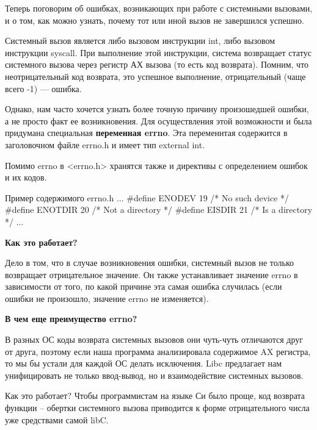 Теперь поговорим об ошибках, возникающих при работе с системными вызовами, и о том, как можно узнать, почему тот или иной вызов не завершился успешно.

Системный вызов является либо вызовом инструкции int, либо вызовом инструкции syscall. При выполнение этой инструкции, система возвращает статус системного вызова через регистр АХ вызова (то есть код возврата). Помним, что неотрицательный код возврата, это успешное выполнение, отрицательный (чаще всего -1) --- ошибка. 

Однако, нам часто хочется узнать более точную причину произошедшей ошибки, а не просто факт ее возникновения. Для осуществления этой возможности и была придумана специальная \textbf{переменная errno}. Эта переменнтая содержится в заголовочном файле errno.h и имеет тип external int.

Помимо errno в <errno.h> хранятся также и директивы с определением ошибок и их кодов.


\begin{CCode}{Пример содержимого errno.h}
	...
	#define ENODEV      19  /* No such device */
	#define ENOTDIR     20  /* Not a directory */
	#define EISDIR      21  /* Is a directory */ 
	... \end{CCode}

\textbf{Как это работает?}

Дело в том, что в случае возникновения ошибки, системный вызов не только возвращает отрицательное значение. Он также устанавливает значение errno в зависимости от того, по какой причине эта самая ошибка случилась (если ошибки не произошло, значение errno не изменяется). 

\textbf{В чем еще преимущество errno?}

В разных ОС коды возврата системных вызовов они чуть-чуть отличаются друг от друга, поэтому если наша программа анализировала содержимое AX регистра, то мы бы устали для каждой ОС делать исключения. Libc предлагает нам унифицировать не только ввод-вывод, но и взаимодействие системных вызовов. 

Как это работает? Чтобы программистам на языке Си было проще, код возврата функции -- обертки системного вызова приводится к форме отрицательного числа уже средствами самой libC. 
